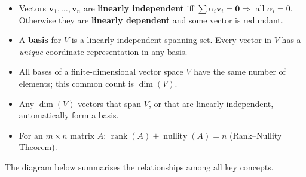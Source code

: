 \documentclass[12pt,a4paper]{article}
\newcommand{\vv}[1]{\mathbf{#1}}
\newcommand{\vzero}{\mathbf{0}}
\DeclareMathOperator{\rank}{rank}
\DeclareMathOperator{\nullity}{nullity}
\begin{document}
		\begin{tcolorbox}[
			enhanced, colback=shadeyellow, colframe=orange!70!black,
			title={\bfseries Chapter Summary}, breakable
			]
			\begin{itemize}[leftmargin=1.5em, itemsep=0.5em]
				\item Vectors $\vv{v}_1, \ldots, \vv{v}_n$ are \textbf{linearly independent}
				iff $\sum\alpha_i\vv{v}_i = \vzero \Rightarrow$ all $\alpha_i = 0$.
				Otherwise they are \textbf{linearly dependent} and some vector is
				redundant.
				\item A \textbf{basis} for $V$ is a linearly independent spanning set.
				Every vector in $V$ has a \emph{unique} coordinate representation in
				any basis.
				\item All bases of a finite-dimensional vector space $V$ have the same
				number of elements; this common count is $\dim(V)$.
				\item Any $\dim(V)$ vectors that span $V$, or that are linearly
				independent, automatically form a basis.
				\item For an $m\times n$ matrix $A$: $\rank(A) + \nullity(A) = n$
				(Rank--Nullity Theorem).
			\end{itemize}
		\end{tcolorbox}
		
		\medskip
		\noindent
		The diagram below summarises the relationships among all key concepts.
		
\end{document}
